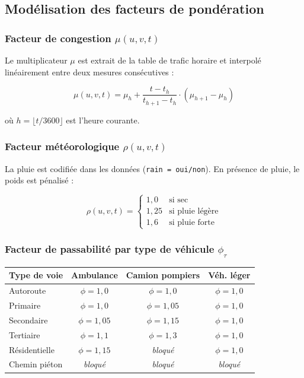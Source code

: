 \documentclass[12pt,a4paper]{article}
\theoremstyle{definition}
\theoremstyle{remark}
\begin{document}
\subsection{Modélisation des facteurs de pondération}

\subsubsection{Facteur de congestion $\mu(u,v,t)$}

Le multiplicateur $\mu$ est extrait de la table de trafic horaire et
interpolé linéairement entre deux mesures consécutives :

$$
\mu(u,v,t) = \mu_h + \frac{t - t_h}{t_{h+1} - t_h} \cdot (\mu_{h+1} - \mu_h)
$$

où $h = \lfloor t / 3600 \rfloor$ est l'heure courante.

\subsubsection{Facteur météorologique $\rho(u,v,t)$}

La pluie est codifiée dans les données (\texttt{rain = oui/non}).
En présence de pluie, le poids est pénalisé :

$$
\rho(u,v,t) = \begin{cases} 1{,}0 & \text{si sec} \\ 1{,}25 & \text{si pluie légère} \\ 1{,}6 & \text{si pluie forte} \end{cases}
$$

\subsubsection{Facteur de passabilité par type de véhicule $\phi_\tau$}

\begin{center}
\begin{tabular}{lccc}
  \toprule
  \textbf{Type de voie} & \textbf{Ambulance} &
  \textbf{Camion pompiers} & \textbf{Véh. léger} \\
  \midrule
  Autoroute    & $\phi = 1{,}0$ & $\phi = 1{,}0$ & $\phi = 1{,}0$ \\
  Primaire     & $\phi = 1{,}0$ & $\phi = 1{,}05$ & $\phi = 1{,}0$ \\
  Secondaire   & $\phi = 1{,}05$ & $\phi = 1{,}15$ & $\phi = 1{,}0$ \\
  Tertiaire    & $\phi = 1{,}1$ & $\phi = 1{,}3$ & $\phi = 1{,}0$ \\
  Résidentielle & $\phi = 1{,}15$ & \textit{bloqué} & $\phi = 1{,}0$ \\
  Chemin piéton & \textit{bloqué} & \textit{bloqué} & \textit{bloqué} \\
  \bottomrule
\end{tabular}
\end{center}
\end{document}
